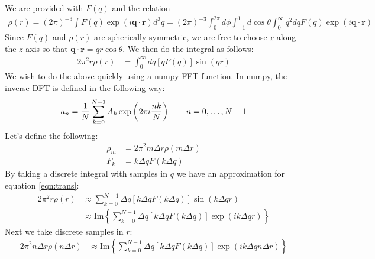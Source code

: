 \documentclass[11pt]{article}
\renewcommand{\vec}[1]{\boldsymbol{#1}}
\begin{document}
We are provided with $F(q)$ and the relation 
\begin{align}
\rho(r) = (2\pi)^{-3} \int F(q) \exp(i\vec{q}\cdot\vec{r}) d^3q = (2\pi)^{-3} \int_0^{2\pi}d\phi \int_{-1}^1 d\cos\theta \int_0^\infty q^2 dq F(q) \exp(i\vec{q}\cdot\vec{r})
\end{align}
Since $F(q)$ and $\rho(r)$ are spherically symmetric, we are free to choose $\vec{r}$ along the $z$ axis so that $\vec{q}\cdot\vec{r} = qr \cos\theta$.  We then do the integral as follows:
\begin{align}
2 \pi^2 r \rho(r) &=  \int_0^\infty  dq   [q F(q)]  \sin(qr)  \label{eqn:trans}
\end{align}
We wish to do the above quickly using a numpy FFT function.  In numpy, the inverse DFT is defined in the following way:
\begin{align}\label{eqn:idft}
a_n = \frac{1}{N}\sum_{k=0}^{N-1}A_k\exp\left(2\pi i{nk\over N}\right) \qquad n = 0,\ldots,N-1
\end{align}
Let's define the following:
\begin{align}
\rho_m &= 2 \pi^2 m\Delta r \rho(m \Delta r) \\
F_k &= k \Delta q F(k \Delta q)
\end{align}
By taking a discrete integral with samples in $q$ we have an approximation for equation \ref{eqn:trans}:
\begin{align}
2 \pi^2 r \rho(r) &\approx  \sum_{k=0}^{N-1}  \Delta q   [k \Delta q F(k \Delta q)]  \sin(k \Delta q r)  \\
  &\approx  \text{Im} \left\{ \sum_{k=0}^{N-1}  \Delta q   [k \Delta q F(k \Delta q)]  \exp( i k \Delta q r) \right\}
\end{align}
Next we take discrete samples in $r$:
\begin{align}\label{eqn:almostft}
2 \pi^2 n \Delta r \rho(n \Delta r) &\approx  \text{Im} \left\{ \sum_{k=0}^{N-1}  \Delta q   [k \Delta q F(k \Delta q)]  \exp( i k \Delta q n \Delta r) \right\}
\end{align}
\end{document}
